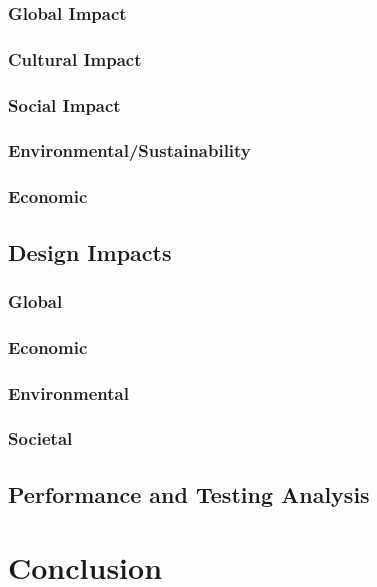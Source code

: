 \documentclass[12pt]{article}
\begin{document}
\subsubsection{Global Impact}

\subsubsection{Cultural Impact}

\subsubsection{Social Impact}

\subsubsection{Environmental/Sustainability}

\subsubsection{Economic}


\subsection{Design Impacts}

\subsubsection{Global}

\subsubsection{Economic}

\subsubsection{Environmental}

\subsubsection{Societal}


\subsection{Performance and Testing Analysis}


\section{Conclusion}
\end{document}
